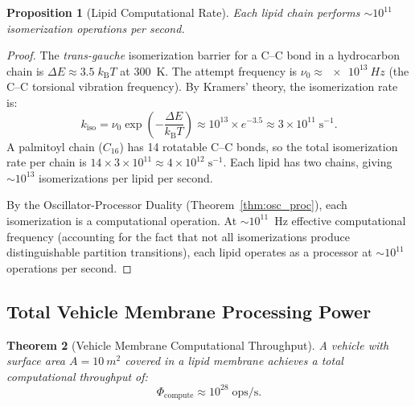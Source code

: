 \documentclass[12pt]{article}
\newtheorem{theorem}{Theorem}[section]
\newtheorem{proposition}[theorem]{Proposition}
\theoremstyle{definition}
\theoremstyle{remark}
\newcommand{\kB}{k_{\mathrm{B}}}
\begin{document}
\begin{proposition}[Lipid Computational Rate]
\label{prop:lipid_rate}
Each lipid chain performs $\sim 10^{11}$ isomerization operations per second.
\end{proposition}

\begin{proof}
The \emph{trans-gauche} isomerization barrier for a C--C bond in a hydrocarbon chain is $\Delta E \approx 3.5\;\kB T$ at \SI{300}{K}. The attempt frequency is $\nu_0 \approx \SI{e13}{Hz}$ (the C--C torsional vibration frequency). By Kramers' theory, the isomerization rate is:
\begin{equation}
  k_{\mathrm{iso}} = \nu_0 \exp\!\left(-\frac{\Delta E}{\kB T}\right) \approx 10^{13} \times e^{-3.5} \approx 3 \times 10^{11}\;\mathrm{s}^{-1}.
  \label{eq:iso_rate}
\end{equation}
A palmitoyl chain ($C_{16}$) has 14 rotatable C--C bonds, so the total isomerization rate per chain is $14 \times 3 \times 10^{11} \approx 4 \times 10^{12}\;\mathrm{s}^{-1}$. Each lipid has two chains, giving $\sim 10^{13}$ isomerizations per lipid per second.

By the Oscillator-Processor Duality (Theorem~\ref{thm:osc_proc}), each isomerization is a computational operation. At $\sim 10^{11}$~Hz effective computational frequency (accounting for the fact that not all isomerizations produce distinguishable partition transitions), each lipid operates as a processor at $\sim 10^{11}$ operations per second.
\end{proof}

\subsection{Total Vehicle Membrane Processing Power}

\begin{theorem}[Vehicle Membrane Computational Throughput]
\label{thm:vehicle_throughput}
A vehicle with surface area $A = \SI{10}{m^2}$ covered in a lipid membrane achieves a total computational throughput of:
\begin{equation}
  \Phi_{\mathrm{compute}} \approx 10^{28}\;\mathrm{ops/s}.
  \label{eq:vehicle_throughput}
\end{equation}
\end{theorem}
\end{document}
